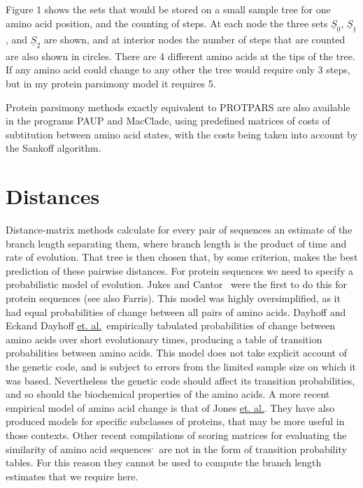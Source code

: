 \documentclass[12pt]{article}
\def\ul{\underline}
\def\fn{\footnotemark\ }
\begin{document}
Figure 1 shows the sets that would be stored on a small sample tree for
one amino acid position, and the counting of steps.  At each node the three
sets $\ul{S}_{\ul{0}}$, $\ul{S}_{\ul{1}}$, and $\ul{S}_{\ul{2}}$ are shown, and at interior nodes the number of
steps that are counted are also shown in circles.  There are 4 different
amino acids at the tips of the tree.  If any amino acid could change to any
other the tree would require only 3 steps, but in my protein parsimony model it
requires 5.

Protein parsimony methods exactly equivalent to PROTPARS are also available in
the programs PAUP and MacClade, using predefined matrices of costs of subtitution between
amino acid states, with the costs being taken into account by the Sankoff
algorithm.

\section*{Distances}

Distance-matrix methods calculate for every pair of sequences an estimate of
the branch length separating them, where branch length is the product of
time and rate of evolution.  That tree is then chosen that, by some criterion,
makes the best prediction of these pairwise distances.  For protein sequences
we need to specify a probabilistic model of evolution.  Jukes and Cantor\fn
were the
first to do this for protein sequences (see also Farris\footnotemark).  This model was highly oversimplified,
as it had equal probabilities of change between all pairs of amino acids.
Dayhoff and Eck\footnotemark and Dayhoff \ul{et. al.}\fn empirically tabulated probabilities of change between amino
acids over short evolutionary times, producing a table of transition
probabilities between amino acids.  This model does not take explicit account
of the genetic code, and is subject to errors from the limited sample size
on which it was based.  Nevertheless the genetic code should affect its
transition probabilities, and so should the biochemical properties of the
amino acids.  A more recent empirical model of amino acid change is that of
Jones \ul{et. al.}\footnotemark.  They have also produced models for specific subclasses
of proteins, that may be more useful in those contexts\footnotemark.
Other recent compilations of scoring matrices for evaluating the similarity
of amino acid sequences\footnotemark$^,$\fn are not in the form of transition probability tables.
For this reason they cannot be used to compute the branch length estimates that
we require here.
\end{document}
